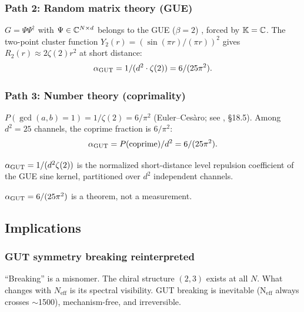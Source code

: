 \subsubsection{Path 2: Random matrix theory (GUE)}

$G = \Psi\Psi^\dagger$ with $\Psi \in \mathbb{C}^{N \times d}$ belongs
to the GUE ($\beta = 2$) \cite{Mehta}, forced by
$\mathbb{K} = \mathbb{C}$. The two-point cluster function $Y_2(r) = (\sin(\pi r)/(\pi r))^2$ gives $R_2(r) \approx 2\zeta(2)r^2$ at short distance:
\begin{equation}
\alpha_{\mathrm{GUT}} = 1/(d^2 \cdot \zeta(2)) = 6/(25\pi^2).
\end{equation}

\subsubsection{Path 3: Number theory (coprimality)}

$P(\gcd(a,b) = 1) = 1/\zeta(2) = 6/\pi^2$
(Euler--Ces\`aro; see \cite{Hardy-Wright}, \S18.5). Among $d^2 = 25$ channels, the coprime fraction is $6/\pi^2$:
\begin{equation}
\alpha_{\mathrm{GUT}} = P(\text{coprime})/d^2 = 6/(25\pi^2).
\end{equation}

\begin{theorem}
$\alpha_{\mathrm{GUT}} = 1/(d^2\zeta(2))$ is the normalized short-distance level repulsion coefficient of the GUE sine kernel, partitioned over $d^2$ independent channels.
\end{theorem}

$\alpha_{\mathrm{GUT}} = 6/(25\pi^2)$ is a theorem, not a measurement.

\subsection{Implications}

\subsubsection{GUT symmetry breaking reinterpreted}

``Breaking'' is a misnomer. The chiral structure $(2,3)$ exists at all $N$. What changes with $N_\text{eff}$ is its spectral visibility. GUT breaking is inevitable (N$_\text{eff}$ always crosses $\sim$1500), mechanism-free, and irreversible.


